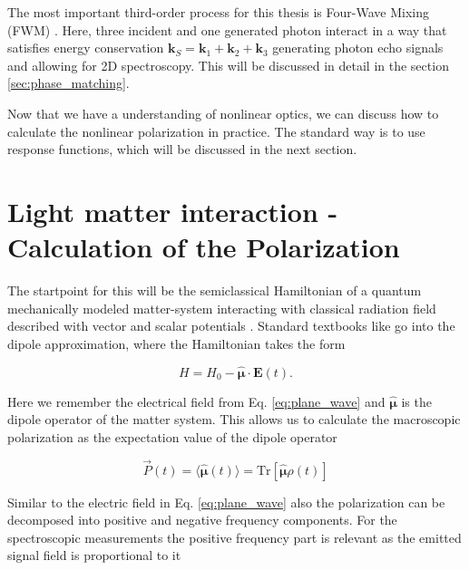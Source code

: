 \noindent
The most important third-order process for this thesis is Four-Wave Mixing (FWM) \cite{boyd2008chapter6nonlinear}. Here, three incident and one generated photon interact in a way that satisfies energy conservation $\mathbf{k}_S = \mathbf{k}_1 + \mathbf{k}_2 + \mathbf{k}_3$ generating photon echo signals and allowing for 2D spectroscopy. This will be discussed in detail in the section \ref{sec:phase_matching}.

\noindent
Now that we have a understanding of nonlinear optics, we can discuss how to calculate the nonlinear polarization in practice. The standard way is to use response functions, which will be discussed in the next section.

\section{Light matter interaction - Calculation of the Polarization}
\label{sec:response_functions}

\noindent
The startpoint for this will be the semiclassical Hamiltonian of a quantum mechanically modeled matter-system interacting with classical radiation field described with vector and scalar potentials .
Standard textbooks like \cite{garrisonchiao2008quantumoptics,gerryknight2024introductoryquantumoptics} go into the dipole approximation, where the Hamiltonian takes the form

\begin{equation}
	H = H_0 - \mathbf{\hat{\mu}} \cdot \mathbf{E}(t).
\end{equation}

\noindent
Here we remember the electrical field from Eq. \ref{eq:plane_wave} and $\mathbf{\hat{\mu}}$ is the dipole operator of the matter system. This allows us to calculate the macroscopic polarization as the expectation value of the dipole operator

\begin{equation}
	\vec{P}(t) = \langle \mathbf{\hat{\mu}}(t) \rangle = \mathrm{Tr}[\mathbf{\hat{\mu}} \rho(t)]
	\label{eq:polarization_expectation_value}
\end{equation}

\noindent
Similar to the electric field in Eq. \eqref{eq:plane_wave} also the polarization can be decomposed into positive and negative frequency components. For the spectroscopic measurements the positive frequency part is relevant as the emitted signal field is proportional to it  \cite{mukamel1995principlesnonlinearoptical}


